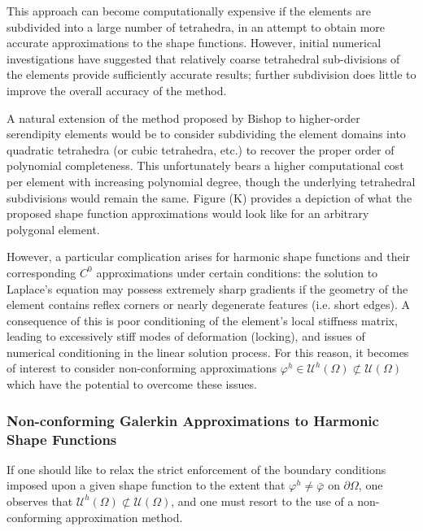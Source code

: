 	This approach can become computationally expensive if the elements are subdivided into a large number of tetrahedra, in an attempt to obtain more accurate approximations to the shape functions. However, initial numerical investigations have suggested that relatively coarse tetrahedral sub-divisions of the elements provide sufficiently accurate results; further subdivision does little to improve the overall accuracy of the method.
	
	A natural extension of the method proposed by Bishop to higher-order serendipity elements would be to consider subdividing the element domains into quadratic tetrahedra (or cubic tetrahedra, etc.) to recover the proper order of polynomial completeness. This unfortunately bears a higher computational cost per element with increasing polynomial degree, though the underlying tetrahedral subdivisions would remain the same. Figure (K) provides a depiction of what the proposed shape function approximations would look like for an arbitrary polygonal element.
	
	However, a particular complication arises for harmonic shape functions and their corresponding $C^0$ approximations under certain conditions: the solution to Laplace's equation may possess extremely sharp gradients if the geometry of the element contains reflex corners or nearly degenerate features (i.e. short edges). A consequence of this is poor conditioning of the element's local stiffness matrix, leading to excessively stiff modes of deformation (locking), and issues of numerical conditioning in the linear solution process. For this reason, it becomes of interest to consider non-conforming approximations $\varphi^h \in \mathcal{U}^h (\Omega) \not\subset \mathcal{U} (\Omega)$ which have the potential to overcome these issues.
	
\subsubsection*{Non-conforming Galerkin Approximations to Harmonic Shape Functions}

	If one should like to relax the strict enforcement of the boundary conditions imposed upon a given shape function to the extent that $\varphi^h \neq \bar{\varphi}$ on $\partial \Omega$, one observes that $\mathcal{U}^h (\Omega) \not\subset \mathcal{U} (\Omega)$, and one must resort to the use of a non-conforming approximation method.
	
